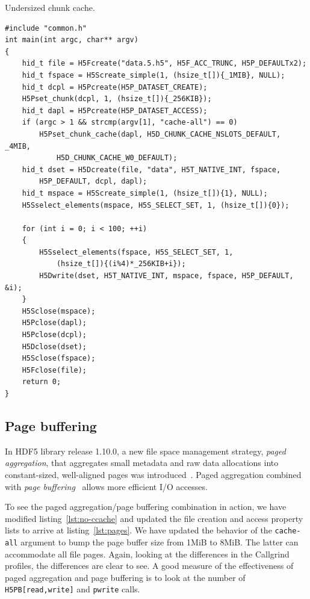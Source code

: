 \begin{listing}
\centering
\caption{Undersized chunk cache.}
\label{lst:no-ccache}
\begin{verbatim}
#include "common.h"
int main(int argc, char** argv)
{
    hid_t file = H5Fcreate("data.5.h5", H5F_ACC_TRUNC, H5P_DEFAULTx2);
    hid_t fspace = H5Screate_simple(1, (hsize_t[]){_1MIB}, NULL);
    hid_t dcpl = H5Pcreate(H5P_DATASET_CREATE);
    H5Pset_chunk(dcpl, 1, (hsize_t[]){_256KIB});
    hid_t dapl = H5Pcreate(H5P_DATASET_ACCESS);
    if (argc > 1 && strcmp(argv[1], "cache-all") == 0)
        H5Pset_chunk_cache(dapl, H5D_CHUNK_CACHE_NSLOTS_DEFAULT, _4MIB,
            H5D_CHUNK_CACHE_W0_DEFAULT);
    hid_t dset = H5Dcreate(file, "data", H5T_NATIVE_INT, fspace,
        H5P_DEFAULT, dcpl, dapl);
    hid_t mspace = H5Screate_simple(1, (hsize_t[]){1}, NULL);
    H5Sselect_elements(mspace, H5S_SELECT_SET, 1, (hsize_t[]){0});
    
    for (int i = 0; i < 100; ++i)
    {
        H5Sselect_elements(fspace, H5S_SELECT_SET, 1,
            (hsize_t[]){(i%4)*_256KIB+i});
        H5Dwrite(dset, H5T_NATIVE_INT, mspace, fspace, H5P_DEFAULT, &i);
    }
    H5Sclose(mspace);
    H5Pclose(dapl);     
    H5Pclose(dcpl);  
    H5Dclose(dset);
    H5Sclose(fspace);
    H5Fclose(file);
    return 0;
}
\end{verbatim}
\end{listing}

\subsection{Page buffering}\label{sub-sec:page-buf}

In HDF5 library release 1.10.0, a new file space management strategy, \textit{paged aggregation}, that aggregates small metadata and raw data allocations into constant-sized, well-aligned pages was introduced~\cite{rfc20120523}. Paged aggregation combined with \textit{page buffering}~\cite{rfc20150709} allows more efficient I/O accesses.

To see the paged aggregation/page buffering combination in action, we have modified listing~\ref{lst:no-ccache} and updated the file creation and access property lists to arrive at listing~\ref{lst:pages}. We have updated the behavior of the \texttt{cache-all} argument to bump the page buffer size from 1MiB to 8MiB. The latter can accommodate all file pages. Again, looking at the differences in the Callgrind profiles, the differences are clear to see. A good measure of the effectiveness of paged aggregation and page buffering is to look at the number of \texttt{H5PB[read,write]} and \texttt{pwrite} calls.

